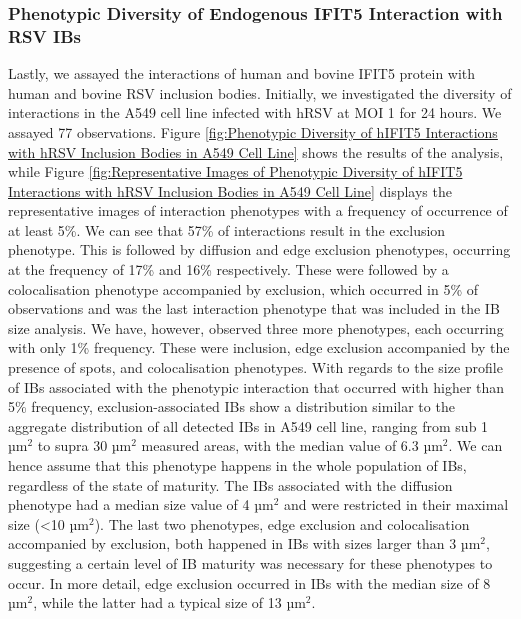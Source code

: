 \subsubsection{Phenotypic Diversity of Endogenous IFIT5 Interaction with RSV IBs}
Lastly, we assayed the interactions of human and bovine IFIT5 protein with human and bovine RSV inclusion bodies. Initially, we investigated the diversity of interactions in the A549 cell line infected with hRSV at MOI 1 for 24 hours. We assayed 77 observations. Figure \ref{fig:Phenotypic Diversity of hIFIT5 Interactions with hRSV Inclusion Bodies in A549 Cell Line} shows the results of the analysis, while Figure \ref{fig:Representative Images of Phenotypic Diversity of hIFIT5 Interactions with hRSV Inclusion Bodies in A549 Cell Line} displays the representative images of interaction phenotypes with a frequency of occurrence of at least 5\%. We can see that 57\% of interactions result in the exclusion phenotype. This is followed by diffusion and edge exclusion phenotypes, occurring at the frequency of 17\% and 16\% respectively. These were followed by a colocalisation phenotype accompanied by exclusion, which occurred in 5\% of observations and was the last interaction phenotype that was included in the IB size analysis. We have, however, observed three more phenotypes, each occurring with only 1\% frequency. These were inclusion, edge exclusion accompanied by the presence of spots, and colocalisation phenotypes. With regards to the size profile of IBs associated with the phenotypic interaction that occurred with higher than 5\% frequency, exclusion-associated IBs show a distribution similar to the aggregate distribution of all detected IBs in A549 cell line, ranging from sub 1 \(\mbox{µm}^2\) to supra 30 \(\mbox{µm}^2\) measured areas, with the median value of 6.3 \(\mbox{µm}^2\). We can hence assume that this phenotype happens in the whole population of IBs, regardless of the state of maturity. The IBs associated with the diffusion phenotype had a median size value of 4 \(\mbox{µm}^2\) and were restricted in their maximal size (<10 \(\mbox{µm}^2\)). The last two phenotypes, edge exclusion and colocalisation accompanied by exclusion, both happened in IBs with sizes larger than 3 \(\mbox{µm}^2\), suggesting a certain level of IB maturity was necessary for these phenotypes to occur. In more detail, edge exclusion occurred in IBs with the median size of 8 \(\mbox{µm}^2\), while the latter had a typical size of 13 \(\mbox{µm}^2\).

